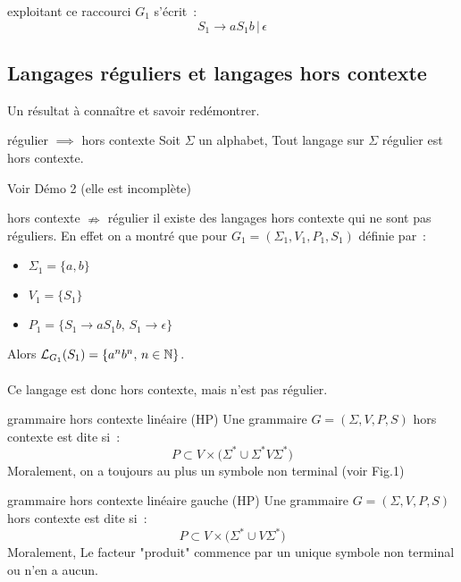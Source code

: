 \begin{adjustwidth}{-3cm}{-3cm}
\begin{exemple}{}{exploitant ce raccourci}
    $G_1$ s'écrit~:
    $$S_1 \rightarrow aS_1b \,\vert\, \epsilon$$
\end{exemple}

\subsection{Langages réguliers et langages hors contexte}

Un résultat à connaître et savoir redémontrer.
\begin{proposition}{}{régulier $\implies$ hors contexte}
    Soit $\Sigma$ un alphabet, Tout langage sur $\Sigma$ régulier est hors contexte.
\end{proposition}
Voir Démo 2 (elle est incomplète)

\begin{remarque}{}{hors contexte $\nRightarrow$ régulier}
    il existe des langages hors contexte qui ne sont pas réguliers. En effet on a montré que pour $G_1 = (\Sigma_1, V_1, P_1, S_1)$ définie par~:
    \begin{itemize}
        \item $\Sigma_1 = \{a,b\}$
        \item $V_1 = \{S_1\}$
        \item $P_1 = \{S_1 \rightarrow a S_1 b,\,S_1\rightarrow \epsilon\}$
    \end{itemize}
    Alors $\mathcal{L}_{G_1}(S_1) = \{a^nb^n,\, n \in \mathbb{N}\}$.\\\\
    Ce langage est donc hors contexte, mais n'est pas régulier.
\end{remarque}

\begin{definition}{}{grammaire hors contexte linéaire (HP)}
    Une grammaire $G = (\Sigma, V, P, S)$ hors contexte est dite  si~:
        $$P \subset V \times \big(\Sigma^* \cup \Sigma^*V\Sigma^*\big)$$
    Moralement, on a toujours au plus un symbole non terminal (voir Fig.1)
\end{definition}

\begin{definition}{}{grammaire hors contexte linéaire gauche (HP)}
    Une grammaire $G = (\Sigma, V, P, S)$ hors contexte est dite  si~:
        $$P \subset V \times \big( \Sigma^* \cup V \Sigma^* \big)$$
    Moralement, Le facteur "produit" commence par un unique symbole non terminal ou n'en a aucun.
\end{definition}


\end{adjustwidth}
